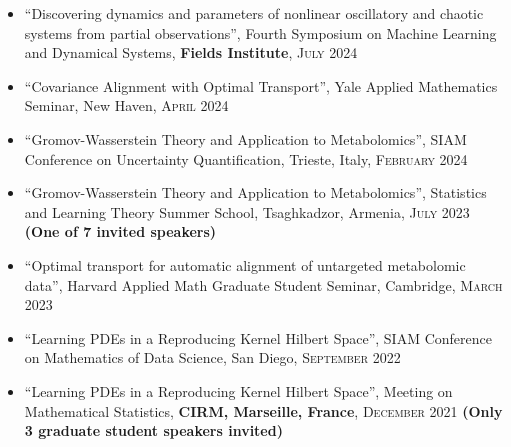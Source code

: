 \documentclass[a4paper,10pt]{article}
\begin{document}
\begin{itemize}
\item ``Discovering dynamics and parameters of nonlinear oscillatory and chaotic systems from partial observations'', Fourth Symposium on Machine Learning and Dynamical Systems, \textbf{Fields Institute}, \textsc{July} 2024

\item ``Covariance Alignment with Optimal Transport'', Yale Applied Mathematics Seminar, New Haven, \textsc{April} 2024

\item ``Gromov-Wasserstein Theory and Application to Metabolomics'', SIAM Conference on Uncertainty Quantification, Trieste, Italy, \textsc{February} 2024

\item ``Gromov-Wasserstein Theory and Application to Metabolomics'', Statistics and Learning Theory Summer School, Tsaghkadzor, Armenia, \textsc{July} 2023 \textbf{(One of 7 invited speakers)}

\item ``Optimal transport for automatic alignment of untargeted metabolomic data'', Harvard Applied Math Graduate Student Seminar, Cambridge, \textsc{March} 2023

\item ``Learning PDEs in a Reproducing Kernel Hilbert Space'', SIAM Conference on Mathematics of Data Science, San Diego, \textsc{September} 2022

\item ``Learning PDEs in a Reproducing Kernel Hilbert Space'', Meeting on Mathematical Statistics, \textbf{CIRM, Marseille, France}, \textsc{December} 2021 \textbf{(Only 3 graduate student speakers invited)}
\end{itemize}
\end{document}
